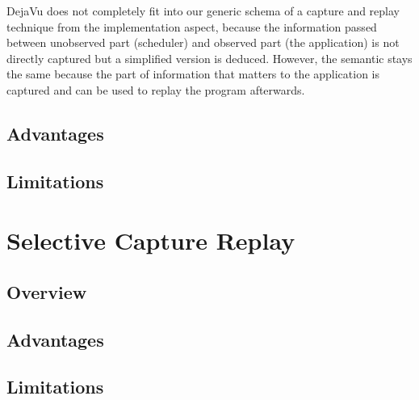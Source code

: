 DejaVu does not completely fit into our generic schema of a capture and replay technique from the implementation aspect, because the information passed between unobserved part (scheduler) and observed part (the application) is not directly captured but a simplified version is deduced. However, the semantic stays the same because the part of information that matters to the application is captured and can be used to replay the program afterwards.

\subsection{Advantages}
\subsection{Limitations}

\section{Selective Capture Replay}
\subsection{Overview}
\subsection{Advantages}
\subsection{Limitations}

